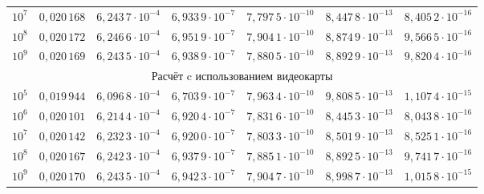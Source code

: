 \begin{table}
\begin{minipage}{15.5cm}
\begin{tabular}{c|c|c|c|c|c|c}
    $10^7$&$0,020\,168$&$6,243\,7\cdot10^{-4}$&$6,933\,9\cdot10^{-7}$&$7,797\,5\cdot10^{-10}$&$8,447\,8\cdot10^{-13}$&$8,405\,2\cdot10^{-16}$\\

        $10^8$&$0,020\,172$&$6,246\,6\cdot10^{-4}$&$6,951\,9\cdot10^{-7}$&$7,904\,1\cdot10^{-10}$&$8,874\,9\cdot10^{-13}$&$9,566\,5\cdot10^{-16}$\\

        $10^9$&$0,020\,169$&$6,243\,5\cdot10^{-4}$&$6,938\,9\cdot10^{-7}$&$7,880\,5\cdot10^{-10}$&$8,892\,9\cdot10^{-13}$&$9,820\,4\cdot10^{-16}$\\

        \hline

        \multicolumn{7}{c}{\rule{0mm}{12pt}Расчёт c использованием видеокарты}\\

        \hline

        \rule{0mm}{12pt}%

        $10^5$&$0,019\,944$&$6,096\,8\cdot10^{-4}$&$6,703\,9\cdot10^{-7}$&$7,963\,4\cdot10^{-10}$&$9,808\,5\cdot10^{-13}$&$1,107\,4\cdot10^{-15}$\\

        $10^6$&$0,020\,101$&$6,214\,4\cdot10^{-4}$&$6,920\,4\cdot10^{-7}$&$7,831\,6\cdot10^{-10}$&$8,445\,3\cdot10^{-13}$&$8,043\,8\cdot10^{-16}$\\

        $10^7$&$0,020\,142$&$6,232\,3\cdot10^{-4}$&$6,920\,0\cdot10^{-7}$&$7,803\,3\cdot10^{-10}$&$8,501\,9\cdot10^{-13}$&$8,525\,1\cdot10^{-16}$\\

        $10^8$&$0,020\,167$&$6,242\,3\cdot10^{-4}$&$6,937\,9\cdot10^{-7}$&$7,885\,1\cdot10^{-10}$&$8,892\,5\cdot10^{-13}$&$9,741\,7\cdot10^{-16}$\\

        $10^9$&$0,020\,170$&$6,243\,5\cdot10^{-4}$&$6,942\,3\cdot10^{-7}$&$7,904\,7\cdot10^{-10}$&$8,998\,7\cdot10^{-13}$&$1,015\,8\cdot10^{-15}$\\

        \hline

    \end{tabular}

\label{kuzentsov:tab-calc-g}

\end{minipage}

\end{table}



